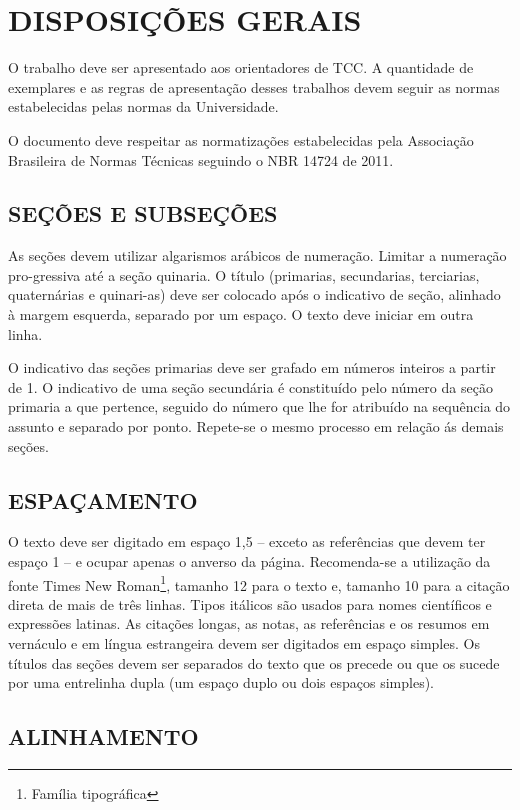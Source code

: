 %
%

\chapter{DISPOSIÇÕES GERAIS}

O trabalho deve ser apresentado aos orientadores de TCC. A quantidade de exemplares e as regras de apresentação desses trabalhos devem seguir as normas estabelecidas pelas normas da Universidade.

O documento deve respeitar as normatizações estabelecidas pela Associação Brasileira de Normas Técnicas seguindo o NBR 14724 de 2011.

\section{SEÇÕES E SUBSEÇÕES}

As seções devem utilizar algarismos arábicos de numeração. Limitar a numeração pro-gressiva até a seção quinaria. O título (primarias, secundarias, terciarias, quaternárias e quinari-as) deve ser colocado após o indicativo de seção, alinhado à margem esquerda, separado por um espaço. O texto deve iniciar em outra linha. 

O indicativo das seções primarias deve ser grafado em números inteiros a partir de 1. O indicativo de uma seção secundária é constituído pelo número da seção primaria a que pertence, seguido do número que lhe for atribuído na sequência do assunto e separado por ponto. Repete-se o mesmo processo em relação ás demais seções.

\section{ESPAÇAMENTO}

O texto deve ser digitado em espaço 1,5 – exceto as referências que devem ter espaço 1 – e ocupar apenas o anverso da página. Recomenda-se a utilização da fonte Times New Roman\footnote{Família tipográfica}, tamanho 12 para o texto e, tamanho 10 para a citação direta de mais de três linhas. Tipos itálicos são usados para nomes científicos e expressões latinas. As citações longas, as notas, as referências e os resumos em vernáculo e em língua estrangeira devem ser digitados em espaço simples. Os títulos das seções devem ser separados do texto que os precede ou que os sucede por uma entrelinha dupla (um espaço duplo ou dois espaços simples).

\section{ALINHAMENTO}

